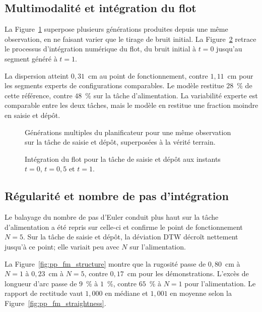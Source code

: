 \subsection*{Multimodalité et intégration du flot}

La Figure~\ref{fig:pp_multimodal} superpose plusieurs générations produites depuis une même observation, en ne faisant varier que le tirage de bruit initial. La Figure~\ref{fig:pp_denoising} retrace le processus d'intégration numérique du flot, du bruit initial à $t=0$ jusqu'au segment généré à $t=1$.

La dispersion atteint $0{,}31$~cm au point de fonctionnement, contre $1{,}11$~cm pour les segments experts de configurations comparables. Le modèle restitue $28$~\% de cette référence, contre $48$~\% sur la tâche d'alimentation. La variabilité experte est comparable entre les deux tâches, mais le modèle en restitue une fraction moindre en saisie et dépôt.

\begin{figure}[!htbp]
    \centering
    
    \caption{Générations multiples du planificateur pour une même observation sur la tâche de saisie et dépôt, superposées à la vérité terrain.}\label{fig:pp_multimodal}
\end{figure}

\begin{figure}[!htbp]
    \centering
    
    \caption{Intégration du flot pour la tâche de saisie et dépôt aux instants $t=0$, $t=0{,}5$ et $t=1$.}\label{fig:pp_denoising}
\end{figure}

\subsection*{Régularité et nombre de pas d'intégration}

Le balayage du nombre de pas d'Euler conduit plus haut sur la tâche d'alimentation a été repris sur celle-ci et confirme le point de fonctionnement $N=5$. Sur la tâche de saisie et dépôt, la déviation \ac{DTW} décroît nettement jusqu'à ce point; elle variait peu avec $N$ sur l'alimentation.

La Figure~\ref{fig:pp_fm_structure} montre que la rugosité passe de $0{,}80$~cm à $N=1$ à $0{,}23$~cm à $N=5$, contre $0{,}17$~cm pour les démonstrations. L'excès de longueur d'arc passe de $9$~\% à $1$~\%, contre $65$~\% à $N=1$ pour l'alimentation. Le rapport de rectitude vaut $1{,}000$ en médiane et $1{,}001$ en moyenne selon la Figure~\ref{fig:pp_fm_straightness}.

